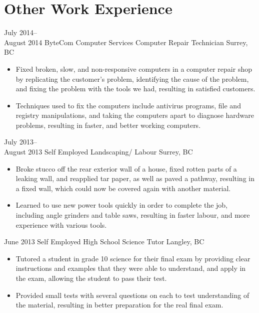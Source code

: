 \documentclass[]{friggeri-cv} %
\begin{document}
\newpage

\section{Other Work Experience}

\begin{entrylist}

\entry
{July 2014--\\August 2014}
{ByteCom Computer Services {\normalfont Computer Repair Technician}}
{Surrey, BC}
{
\begin{itemize}
\item Fixed broken, slow, and non-responsive computers in a computer repair shop by
replicating the customer’s
problem, identifying the cause of the problem, and fixing the problem with the
tools we had, resulting in satisfied
customers.
\item Techniques used to fix the computers include antivirus programs, file and
registry manipulations, and taking the
computers apart to diagnose hardware problems, resulting in faster, and better
working computers.
\end{itemize}
}

\entry
{July 2013--\\August 2013}
{Self Employed {\normalfont Landscaping/ Labour}}
{Surrey, BC}
{
\begin{itemize}
\item Broke stucco off the rear exterior wall of a house, fixed rotten parts of a
leaking wall, and reapplied tar paper, as
well as paved a pathway, resulting in a fixed wall, which could now be covered
again with another material.
\item Learned to use new power tools quickly in order to complete the job, including
angle grinders and table saws,
resulting in faster labour, and more experience with various tools.
\end{itemize}
}
\entry
{June 2013}
{Self Employed {\normalfont High School Science Tutor}}
{Langley, BC}
{
\begin{itemize}
\item Tutored a student in grade 10 science for their final exam by providing clear
instructions and examples that they
were able to understand, and apply in the exam, allowing the student to pass
their test.
\item Provided small tests with several questions on each to test understanding of
the material, resulting in better
preparation for the real final exam.
\end{itemize}
}
\end{entrylist}
\end{document}
